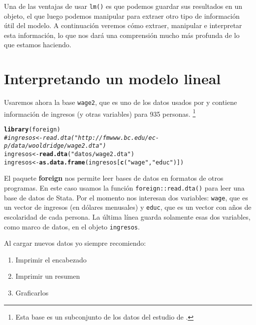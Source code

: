 \documentclass{report}\usepackage[]{graphicx}\usepackage[]{color}
\makeatletter
\newcommand{\hlstr}[1]{\textcolor[rgb]{0.192,0.494,0.8}{#1}}%
\newcommand{\hlcom}[1]{\textcolor[rgb]{0.678,0.584,0.686}{\textit{#1}}}%
\newcommand{\hlstd}[1]{\textcolor[rgb]{0.345,0.345,0.345}{#1}}%
\newcommand{\hlkwb}[1]{\textcolor[rgb]{0.69,0.353,0.396}{#1}}%
\newcommand{\hlkwd}[1]{\textcolor[rgb]{0.737,0.353,0.396}{\textbf{#1}}}%
\newenvironment{kframe}{%
 \def\at@end@of@kframe{}%
 \ifinner\ifhmode%
  \def\at@end@of@kframe{\end{minipage}}%
  \begin{minipage}{\columnwidth}%
 \fi\fi%
 \def\FrameCommand##1{\hskip\@totalleftmargin \hskip-\fboxsep
 \colorbox{shadecolor}{##1}\hskip-\fboxsep
     \hskip-\linewidth \hskip-\@totalleftmargin \hskip\columnwidth}%
 \MakeFramed {\advance\hsize-\width
   \@totalleftmargin\z@ \linewidth\hsize
   \@setminipage}}%
 {\par\unskip\endMakeFramed%
 \at@end@of@kframe}
\newenvironment{knitrout}{}{} %
\newcommand*{\paq}[1]{\textbf{#1}\index{#1@\textbf{#1}}}
\makeatother
\begin{document}
Una de las ventajas de usar \verb|lm()| es que podemos guardar sus resultados en un objeto, el que luego podemos manipular para extraer otro tipo de información útil del modelo. A continuación veremos cómo extraer, manipular e interpretar esta información, lo que nos dará una comprensión mucho más profunda de lo que estamos haciendo.


\section{Interpretando un modelo lineal}

Usaremos ahora la base \verb|wage2|, que es uno de los datos usados por \textcite{wooldridge_introductory_2013} y contiene información de ingresos (y otras variables) para 935 personas. \footnote{Esta base es un subconjunto de los datos del estudio de \textcite{blackburn_unobserved_1992}.}

\begin{knitrout}
\color{fgcolor}\begin{kframe}
\begin{alltt}
\hlkwd{library}\hlstd{(foreign)}
\hlcom{#ingresos <- read.dta("http://fmwww.bc.edu/ec-p/data/wooldridge/wage2.dta")}
\hlstd{ingresos} \hlkwb{<-} \hlkwd{read.dta}\hlstd{(}\hlstr{"datos/wage2.dta"}\hlstd{)}
\hlstd{ingresos} \hlkwb{<-} \hlkwd{as.data.frame}\hlstd{(ingresos[}\hlkwd{c}\hlstd{(}\hlstr{"wage"}\hlstd{,}\hlstr{"educ"}\hlstd{)])}
\end{alltt}
\end{kframe}
\end{knitrout}

El paquete \paq{foreign} nos permite leer bases de datos en formatos de otros programas. En este caso usamos la función \verb|foreign::read.dta()| para leer una base de datos de Stata.
Por el momento nos interesan dos variables: \verb|wage|, que es un vector de ingresos (en dólares menusales) y \verb|educ|, que es un vector con años de escolaridad de cada persona. La última línea guarda solamente esas dos variables, como marco de datos, en el objeto \verb|ingresos|.

Al cargar nuevos datos yo siempre recomiendo:
\begin{enumerate}
\item Imprimir el encabezado
\item Imprimir un resumen
\item Graficarlos
\end{enumerate}
\end{document}
